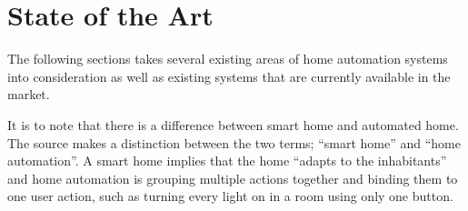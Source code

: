 \section{State of the Art}\label{sec:sota}
The following sections takes several existing areas of home automation systems into consideration as well as existing systems that are currently available in the market.

It is to note that there is a difference between smart home and automated home. The source \cite{HAInterviews} makes a distinction between the two terms; \enquote{smart home} and \enquote{home automation}. A smart home implies that the home \enquote{adapts to the inhabitants}\cite{HAInterviews} and home automation is grouping multiple actions together and binding them to one user action, such as turning every light on in a room using only one button.




